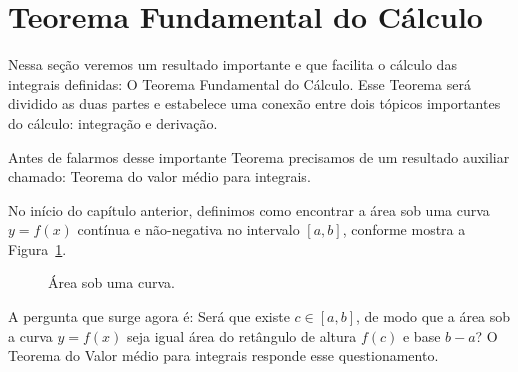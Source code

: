 \section{Teorema Fundamental do Cálculo}
\label{sec:teorema_fundamental_calculo}

Nessa seção veremos um resultado importante e que facilita o cálculo das integrais
definidas: O Teorema Fundamental do Cálculo. Esse Teorema será dividido as duas
partes e estabelece uma conexão entre dois tópicos importantes do cálculo:
integração e derivação.

Antes de falarmos desse importante Teorema precisamos de um resultado auxiliar
chamado: Teorema do valor médio para integrais.

No início do capítulo anterior, definimos como encontrar a área sob uma curva
$y=f(x)$ contínua e não-negativa no intervalo $[a, b]$, conforme mostra a
Figura~\ref{fig:areasobumacurva2}.

\begin{figure}[h!]
   \centering
   
   \caption{Área sob uma curva.}
   \label{fig:areasobumacurva2}
\end{figure}

A pergunta que surge agora é: Será que existe $c \in [a, b]$, de modo que a área
sob a curva $y=f(x)$ seja igual área do retângulo de altura $f(c)$ e base $b-a$?
O Teorema do Valor médio para integrais responde esse questionamento.

%   

%   

